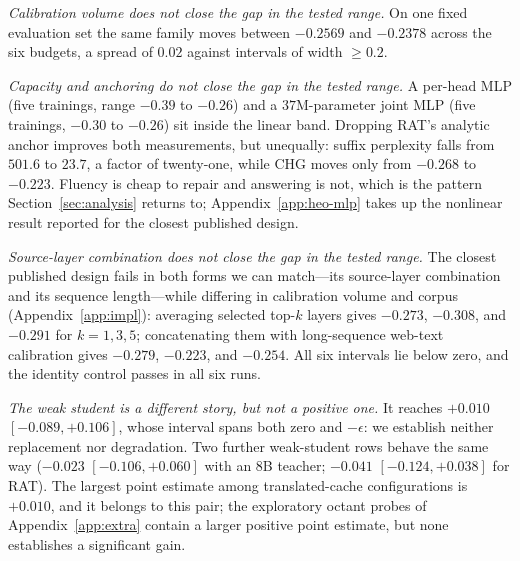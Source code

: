 \documentclass[10pt]{article}
\begin{document}
\emph{Calibration volume does not close the gap in the tested range.} On one fixed evaluation set the same
family moves between $-0.2569$ and $-0.2378$ across the six budgets, a spread
of $0.02$ against intervals of width $\ge 0.2$.

\emph{Capacity and anchoring do not close the gap in the tested range.} A per-head MLP (five
trainings, range $-0.39$ to $-0.26$) and a $37$M-parameter joint MLP (five
trainings, $-0.30$ to $-0.26$) sit inside the linear band. Dropping RAT's
analytic anchor improves both measurements, but unequally: suffix perplexity
falls from $501.6$ to $23.7$, a factor of twenty-one, while CHG moves only from
$-0.268$ to $-0.223$. Fluency is cheap to repair and answering is not, which is
the pattern Section~\ref{sec:analysis} returns to; Appendix~\ref{app:heo-mlp}
takes up the nonlinear result reported for the closest published design.

\emph{Source-layer combination does not close the gap in the tested range.} The closest published design
fails in both forms we can match---its source-layer combination and its
sequence length---while differing in calibration volume and corpus
(Appendix~\ref{app:impl}): averaging selected top-$k$ layers gives $-0.273$,
$-0.308$, and $-0.291$ for $k{=}1,3,5$; concatenating them with long-sequence
web-text calibration gives $-0.279$, $-0.223$, and $-0.254$. All six intervals
lie below zero, and the identity control passes in all six runs.

\emph{The weak student is a different story, but not a positive one.} It reaches
$+0.010$ $[-0.089,+0.106]$, whose interval spans both zero and $-\epsilon$: we
establish neither replacement nor degradation. Two further weak-student rows
behave the same way ($-0.023$ $[-0.106,+0.060]$ with an $8$B teacher; $-0.041$
$[-0.124,+0.038]$ for RAT). The largest point estimate among translated-cache
configurations is $+0.010$, and it belongs to this pair; the exploratory octant
probes of Appendix~\ref{app:extra} contain a larger positive point estimate, but
none establishes a significant gain.
\end{document}
